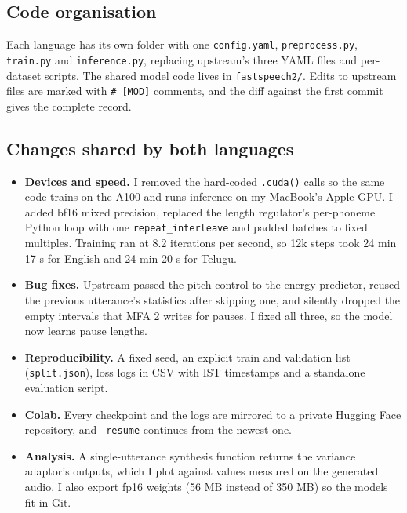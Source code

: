 \documentclass[11pt,a4paper]{article}
\newcommand{\code}[1]{\texttt{#1}}
\begin{document}
\subsection{Code organisation}
Each language has its own folder with one \code{config.yaml}, \code{preprocess.py}, \code{train.py} and
\code{inference.py}, replacing upstream's three YAML files and per-dataset scripts. The shared model code lives in
\code{fastspeech2/}. Edits to upstream files are marked with \code{\# [MOD]} comments, and the diff against the first
commit gives the complete record.

\subsection{Changes shared by both languages}
\begin{itemize}
\item \textbf{Devices and speed.} I removed the hard-coded \code{.cuda()} calls so the same code trains on the A100
  and runs inference on my MacBook's Apple GPU. I added bf16 mixed precision, replaced the length regulator's
  per-phoneme Python loop with one \code{repeat\_interleave} and padded batches to fixed multiples. Training ran
  at 8.2 iterations per second, so 12k steps took 24 min 17 s for English and 24 min 20 s for Telugu.
\item \textbf{Bug fixes.} Upstream passed the pitch control to the energy predictor, reused the previous
  utterance's statistics after skipping one, and silently dropped the empty intervals that MFA 2 writes for pauses.
  I fixed all three, so the model now learns pause lengths.
\item \textbf{Reproducibility.} A fixed seed, an explicit train and validation list (\code{split.json}), loss
  logs in CSV with IST timestamps and a standalone evaluation script.
\item \textbf{Colab.} Every checkpoint and the logs are mirrored to a private Hugging Face repository, and
  \code{--resume} continues from the newest one.
\item \textbf{Analysis.} A single-utterance synthesis function returns the variance adaptor's outputs, which I
  plot against values measured on the generated audio. I also export fp16 weights (56 MB instead of 350 MB) so the
  models fit in Git.
\end{itemize}
\end{document}
